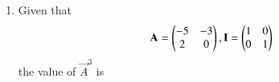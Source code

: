 \documentclass[journal]{IEEEtran}
\begin{document}
\begin{enumerate}
\begin{enumerate}
\end{enumerate}
\item Given that
	\begin{align*}
		\mathbf{A}=\begin{pmatrix}-5&-3\\2&0\end{pmatrix},\mathbf{I}=\begin{pmatrix}1&0\\0&1\end{pmatrix}
	\end{align*}
	the value of $\vec{A}^3$ is
\begin{enumerate}
\end{enumerate}
\end{enumerate}
\end{document}
